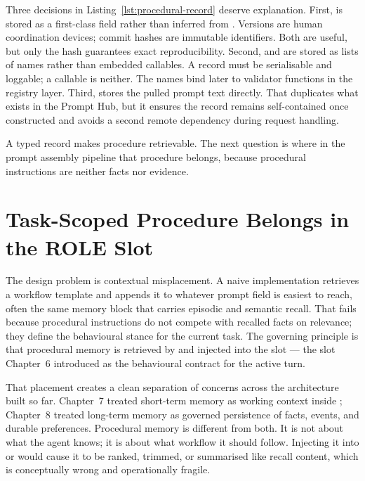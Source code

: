Three decisions in Listing~\ref{lst:procedural-record} deserve explanation. First,  is stored as a first-class field rather than inferred from . Versions are human coordination devices; commit hashes are immutable identifiers. Both are useful, but only the hash guarantees exact reproducibility. Second,  and  are stored as lists of names rather than embedded callables. A record must be serialisable and loggable; a callable is neither. The names bind later to validator functions in the registry layer. Third,  stores the pulled prompt text directly. That duplicates what exists in the Prompt Hub, but it ensures the record remains self-contained once constructed and avoids a second remote dependency during request handling.

A typed record makes procedure retrievable. The next question is where in the prompt assembly pipeline that procedure belongs, because procedural instructions are neither facts nor evidence.

\section{Task-Scoped Procedure Belongs in the ROLE Slot}
\label{sec:retrieval-targets-role}

The design problem is contextual misplacement. A naive implementation retrieves a workflow template and appends it to whatever prompt field is easiest to reach, often the same memory block that carries episodic and semantic recall. That fails because procedural instructions do not compete with recalled facts on relevance; they define the behavioural stance for the current task. The governing principle is that procedural memory is retrieved by  and injected into the  slot --- the slot Chapter~6 introduced as the behavioural contract for the active turn.

That placement creates a clean separation of concerns across the architecture built so far. Chapter~7 treated short-term memory as working context inside ; Chapter~8 treated long-term memory as governed persistence of facts, events, and durable preferences. Procedural memory is different from both. It is not about what the agent knows; it is about what workflow it should follow. Injecting it into  or  would cause it to be ranked, trimmed, or summarised like recall content, which is conceptually wrong and operationally fragile.

